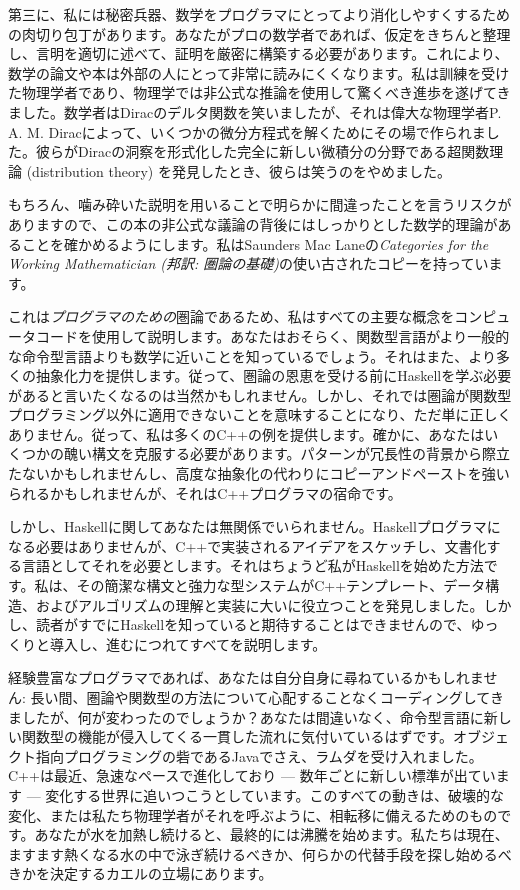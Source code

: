 第三に、私には秘密兵器、数学をプログラマにとってより消化しやすくするための肉切り包丁があります。あなたがプロの数学者であれば、仮定をきちんと整理し、言明を適切に述べて、証明を厳密に構築する必要があります。これにより、数学の論文や本は外部の人にとって非常に読みにくくなります。私は訓練を受けた物理学者であり、物理学では非公式な推論を使用して驚くべき進歩を遂げてきました。数学者はDiracのデルタ関数を笑いましたが、それは偉大な物理学者P. A. M. Diracによって、いくつかの微分方程式を解くためにその場で作られました。彼らがDiracの洞察を形式化した完全に新しい微積分の分野である超関数理論 (distribution theory) を発見したとき、彼らは笑うのをやめました。

もちろん、噛み砕いた説明を用いることで明らかに間違ったことを言うリスクがありますので、この本の非公式な議論の背後にはしっかりとした数学的理論があることを確かめるようにします。私はSaunders Mac Laneの\emph{Categories for the Working Mathematician (邦訳: 圏論の基礎)}の使い古されたコピーを持っています。

これは\emph{プログラマのための}圏論であるため、私はすべての主要な概念をコンピュータコードを使用して説明します。あなたはおそらく、関数型言語がより一般的な命令型言語よりも数学に近いことを知っているでしょう。それはまた、より多くの抽象化力を提供します。従って、圏論の恩恵を受ける前にHaskellを学ぶ必要があると言いたくなるのは当然かもしれません。しかし、それでは圏論が関数型プログラミング以外に適用できないことを意味することになり、ただ単に正しくありません。従って、私は多くのC++の例を提供します。確かに、あなたはいくつかの醜い構文を克服する必要があります。パターンが冗長性の背景から際立たないかもしれませんし、高度な抽象化の代わりにコピーアンドペーストを強いられるかもしれませんが、それはC++プログラマの宿命です。

しかし、Haskellに関してあなたは無関係でいられません。Haskellプログラマになる必要はありませんが、C++で実装されるアイデアをスケッチし、文書化する言語としてそれを必要とします。それはちょうど私がHaskellを始めた方法です。私は、その簡潔な構文と強力な型システムがC++テンプレート、データ構造、およびアルゴリズムの理解と実装に大いに役立つことを発見しました。しかし、読者がすでにHaskellを知っていると期待することはできませんので、ゆっくりと導入し、進むにつれてすべてを説明します。

経験豊富なプログラマであれば、あなたは自分自身に尋ねているかもしれません: 長い間、圏論や関数型の方法について心配することなくコーディングしてきましたが、何が変わったのでしょうか？あなたは間違いなく、命令型言語に新しい関数型の機能が侵入してくる一貫した流れに気付いているはずです。オブジェクト指向プログラミングの砦であるJavaでさえ、ラムダを受け入れました。C++は最近、急速なペースで進化しており --- 数年ごとに新しい標準が出ています --- 変化する世界に追いつこうとしています。このすべての動きは、破壊的な変化、または私たち物理学者がそれを呼ぶように、相転移に備えるためのものです。あなたが水を加熱し続けると、最終的には沸騰を始めます。私たちは現在、ますます熱くなる水の中で泳ぎ続けるべきか、何らかの代替手段を探し始めるべきかを決定するカエルの立場にあります。

